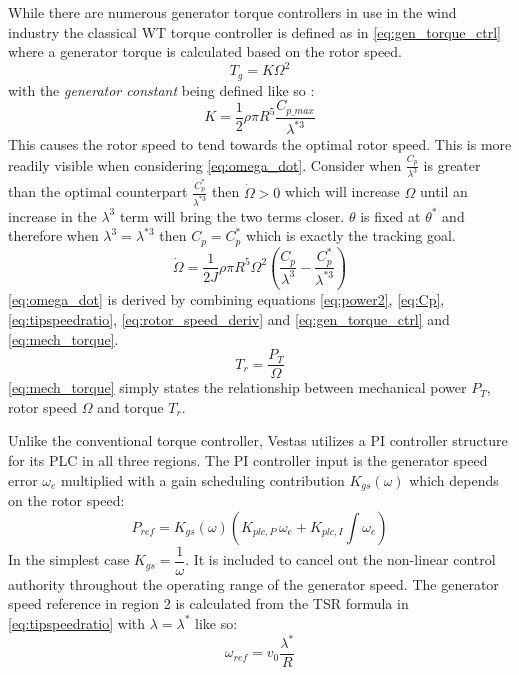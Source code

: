 While there are numerous generator torque controllers in use in the wind industry the classical WT torque controller is defined as in \cref{eq:gen_torque_ctrl} where a generator torque is calculated based on the rotor speed.
\begin{equation}\label{eq:gen_torque_ctrl}
	T_g = K \Omega^2
\end{equation}
with the \textit{generator constant} being defined like so \cite{Pao2009}:
\begin{equation}\label{eq:gen_torque_const}
	K = \dfrac{1}{2} \rho \pi R^5 \dfrac{C_{p\_max}}{\lambda^{*3}}
\end{equation}
This causes the rotor speed to tend towards the optimal rotor speed. This is more readily visible when considering \cref{eq:omega_dot}. Consider when $ \frac{C_p}{\lambda^3} $ is greater than the optimal counterpart $ \frac{C_p^*}{\lambda^{*3}} $ then $ \dot{\Omega} > 0 $ which will increase $ \Omega $ until an increase in the $ \lambda^3 $ term will bring the two terms closer. $ \theta $ is fixed at $ \theta^* $ and therefore when $ \lambda^3 = \lambda^{*3} $ then $ C_p = C_p^* $ which is exactly the tracking goal.
\begin{equation}\label{eq:omega_dot}
	\dot{\Omega} = \dfrac{1}{2 J} \rho \pi R^5 \Omega^2 \left( \dfrac{C_p}{\lambda^3} - \dfrac{C_p^*}{\lambda^{*3}} \right)
\end{equation}
\cref{eq:omega_dot} is derived by combining equations \cref{eq:power2}, \cref{eq:Cp}, \cref{eq:tipspeedratio}, \cref{eq:rotor_speed_deriv} and \cref{eq:gen_torque_ctrl} and \cref{eq:mech_torque}.
\begin{equation}\label{eq:mech_torque}
	T_r = \dfrac{P_T}{\Omega}
\end{equation}
\cref{eq:mech_torque} simply states the relationship between mechanical power $ P_T $, rotor speed $ \Omega $ and torque $ T_r $.

\medskip
Unlike the conventional torque controller, Vestas utilizes a PI controller structure for its PLC in all three regions. The PI controller input is the generator speed error $ \omega_e $ multiplied with a gain scheduling contribution $ K_{gs}(\omega) $ which depends on the rotor speed:
\begin{equation}\label{eq:pi_plc_ctrl}
	P_{ref} = K_{gs}(\omega) \left(K_{plc,P} \, \omega_e + K_{plc,I} \int \omega_e\right)
\end{equation}
In the simplest case $ K_{gs} = \dfrac{1}{\omega} $. It is included to cancel out the non-linear control authority throughout the operating range of the generator speed.
The generator speed reference in region 2 is calculated from the TSR formula in \cref{eq:tipspeedratio} with $ \lambda = \lambda^* $ like so:
\begin{equation}\label{eq:omega_ref_from_tsr}
	\omega_{ref} = v_0 \dfrac{\lambda^*}{R}
\end{equation} 

